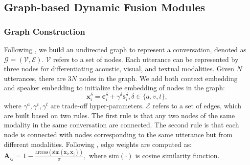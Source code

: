  

\subsection{Graph-based Dynamic Fusion Modules}
\subsubsection{Graph Construction}
Following \cite{DBLP:conf/acl/HuLZJ20}, we build an undirected graph to represent a conversation, denoted as $\mathcal{G} = (\mathcal{V}, \mathcal{E})$.
$\mathcal{V}$ refers to a set of nodes. Each utterance can be represented by three nodes for differentiating acoustic, visual, and textual modalities. Given $N$ utterances, there are $3N$ nodes in the graph.
We add both context embedding and speaker embedding to initialize the embedding of nodes in the graph:
\begin{equation}
  \mathbf{x}^{\delta}_i = \mathbf{c}^{\delta}_i + \gamma^{\delta} \mathbf{s}^{\delta}_i, \delta \in \{ a, v, t\},
\end{equation} 
where $\gamma^{a}, \gamma^{v}, \gamma^{t}$ are trade-off hyper-parameters.
$\mathcal{E}$ refers to a set of edges, which are built based on two rules. 
The first rule is that any two nodes of the same modality in the same conversation are connected.
The second rule is that each node is connected with nodes corresponding to the same utterance but from different modalities.
Following \cite{DBLP:conf/textgraphs/SkianisMV18}, edge weights are computed as:
$\mathbf{A}_{ij} = 1 - \frac{\text{arccos}(\text{sim}(\mathbf{x}_i,\mathbf{x}_j))}{\pi},$
where $\text{sim}(\cdot)$ is cosine similarity function.

